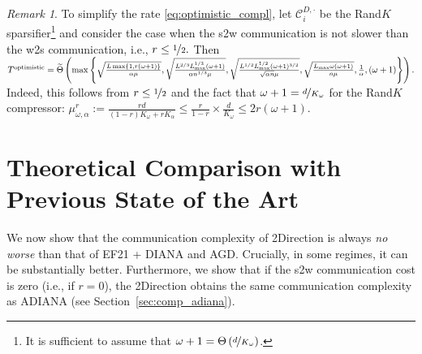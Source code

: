 \documentclass{article} %
\newcommand{\cC}{\mathcal{C}}
\theoremstyle{plain}
\theoremstyle{definition}
\theoremstyle{remark}
\newtheorem{remark}[theorem]{Remark}
\newcommand{\eqdef}{:=}
\newcommand{\green}{\color{mydarkgreen}}
\newcommand{\algname}[1]{{\small\green\sf #1}}
\begin{document}
\begin{remark}
  \label{rem:optimistic}
  To simplify the rate \eqref{eq:optimistic_compl}, let $\cC_i^{D, \cdot}$ be the Rand$K$ sparsifier\footnote{It is sufficient to assume that $\omega + 1 = \Theta\left(\nicefrac{d}{K_{\omega}}\right)$.} and consider the case when the s2w communication is not slower than the w2s communication, i.e., $r \leq \nicefrac{1}{2}.$ Then
  {\small$T^{\textnormal{optimistic}} = \widetilde{\Theta}\left(\max\left\{\sqrt{\frac{L \max\{1, r \left(\omega + 1\right)\}}{\alpha \mu}}, \sqrt{\frac{L^{2/3} L_{\max}^{1/3} (\omega + 1)}{\alpha n^{1/3} \mu}}, \sqrt{\frac{L^{1/2} L_{\max}^{1/2} (\omega + 1)^{3/2}}{\sqrt{\alpha n} \mu}}, \sqrt{\frac{L_{\max} \omega (\omega + 1)}{n \mu}}, \frac{1}{\alpha}, (\omega + 1)\right\}\right).$}
Indeed, this follows from $r \leq \nicefrac{1}{2}$ and the fact that $\omega + 1 = \nicefrac{d}{K_{\omega}}$ for the Rand$K$ compressor:
    $\mu^r_{\omega, \alpha} \eqdef \frac{rd}{(1 - r) K_{\omega} + r K_{\alpha}} \leq \frac{r}{1 - r} \times \frac{d}{K_{\omega}} \leq 2 r \left(\omega + 1\right)$.
    
\end{remark}


\section{Theoretical Comparison with Previous  State of the Art}
\label{sec:sanity_check}
We now show that the communication complexity of \algname{2Direction} is always {\em no worse}  than that of \algname{EF21 + DIANA} and \algname{AGD}. Crucially, in some regimes, it can be substantially better. Furthermore, we show that if the s2w communication cost is zero (i.e., if $r=0$), the \algname{2Direction} obtains the same communication complexity as  \algname{ADIANA} \citep{ADIANA} (see Section~\ref{sec:comp_adiana}).
\end{document}
